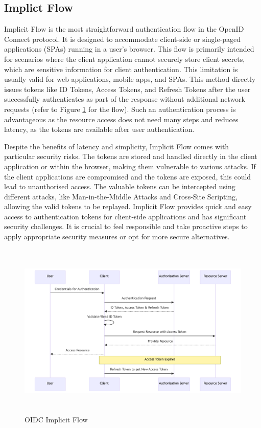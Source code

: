 \subsection{Implict Flow}
Implicit Flow is the most straightforward authentication flow in the OpenID Connect protocol. It is designed to accommodate client-side or single-paged applications (SPAs) running in a user's browser. This flow is primarily intended for scenarios where the client application cannot securely store client secrets, which are sensitive information for client authentication. This limitation is usually valid for web applications, mobile apps, and SPAs. This method directly issues tokens like ID Tokens, Access Tokens, and Refresh Tokens after the user successfully authenticates as part of the response without additional network requests (refer to Figure \ref{fig:implicit_flow} for the flow). Such an authentication process is advantageous as the resource access does not need many steps and reduces latency, as the tokens are available after user authentication. 

Despite the benefits of latency and simplicity, Implicit Flow comes with particular security risks. The tokens are stored and handled directly in the client application or within the browser, making them vulnerable to various attacks. If the client applications are compromised and the tokens are exposed, this could lead to unauthorised access. The valuable tokens can be intercepted using different attacks, like Man-in-the-Middle Attacks and Cross-Site Scripting, allowing the valid tokens to be replayed. Implicit Flow provides quick and easy access to authentication tokens for client-side applications and has significant security challenges. It is crucial to feel responsible and take proactive steps to apply appropriate security measures or opt for more secure alternatives.

\begin{figure}[h!]
\centering
\label{fig:implicit_flow}
\includegraphics[width=\textwidth, height=320px]{pics/implicit_flow.pdf}
\caption{OIDC Implicit Flow}
\end{figure}

